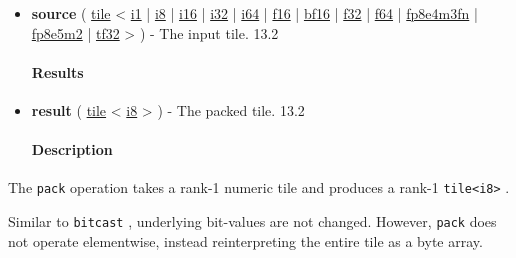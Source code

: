 \documentclass{article}
\begin{document}
\begin{itemize}
\item \textbf{source} ( \href{https://docs.nvidia.com/cuda/tile-ir/latest/sections/types.html#type-tile}{tile} < \href{https://docs.nvidia.com/cuda/tile-ir/latest/sections/types.html#subsection-element-types}{i1} | \href{https://docs.nvidia.com/cuda/tile-ir/latest/sections/types.html#subsection-element-types}{i8} | \href{https://docs.nvidia.com/cuda/tile-ir/latest/sections/types.html#subsection-element-types}{i16} | \href{https://docs.nvidia.com/cuda/tile-ir/latest/sections/types.html#subsection-element-types}{i32} | \href{https://docs.nvidia.com/cuda/tile-ir/latest/sections/types.html#subsection-element-types}{i64} | \href{https://docs.nvidia.com/cuda/tile-ir/latest/sections/types.html#subsection-element-types}{f16} | \href{https://docs.nvidia.com/cuda/tile-ir/latest/sections/types.html#subsection-element-types}{bf16} | \href{https://docs.nvidia.com/cuda/tile-ir/latest/sections/types.html#subsection-element-types}{f32} | \href{https://docs.nvidia.com/cuda/tile-ir/latest/sections/types.html#subsection-element-types}{f64} | \href{https://docs.nvidia.com/cuda/tile-ir/latest/sections/types.html#subsection-element-types}{fp8e4m3fn} | \href{https://docs.nvidia.com/cuda/tile-ir/latest/sections/types.html#subsection-element-types}{fp8e5m2} | \href{https://docs.nvidia.com/cuda/tile-ir/latest/sections/types.html#subsection-element-types}{tf32} > ) - The input tile. 13.2


\paragraph{Results}

\item \textbf{result} ( \href{https://docs.nvidia.com/cuda/tile-ir/latest/sections/types.html#type-tile}{tile} < \href{https://docs.nvidia.com/cuda/tile-ir/latest/sections/types.html#subsection-element-types}{i8} > ) - The packed tile. 13.2


\paragraph{Description}

\end{itemize}
The \texttt{pack} operation takes a rank-1 numeric tile and produces a rank-1 \texttt{tile<i8>} .


Similar to \texttt{bitcast} , underlying bit-values are not changed. However, \texttt{pack} does not operate elementwise, instead reinterpreting the entire tile as a byte array.
\end{document}
